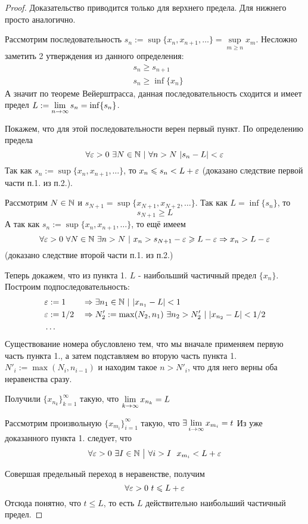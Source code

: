\begin{proof}
	Доказательство приводится только для верхнего предела. Для нижнего просто аналогично.
	
	Рассмотрим последовательность $s_n := \sup \{x_n, x_{n + 1}, \dots\} = \sup\limits_{m \ge n} x_m$. Несложно заметить 2 утверждения из данного определения:
	\begin{align*}
		&s_n \ge s_{n + 1}
		\\
		&s_n \ge \inf \{x_n\}
	\end{align*}
	А значит по теореме Вейерштрасса, данная последовательность сходится и имеет предел $L := \lim\limits_{n \to \infty} s_n = \inf \{s_n\}$. 
	
	Покажем, что для этой последовательности верен первый пункт. По определению предела 
	$$
		\forall \eps > 0\ \exists N \in \N\ |\ \forall n > N\ |s_n - L| < \eps
	$$
	Так как $s_n := \sup \{x_n, x_{n + 1}, \dots\}$, то $x_n \leqslant s_n < L + \varepsilon$ (доказано следствие первой части п.1. из п.2.).
	
	Рассмотрим $N \in \mathbb{N}$ и $s_{N + 1} = \sup \{x_{N + 1}, x_{N + 2}, \dots\}$. Так как $L = \inf \{s_n\}$, то 
	$$
		s_{N + 1} \ge L
	$$
	А так как $s_n := \sup \{x_n, x_{n + 1}, \dots\}$, то ещё имеем
	$$
		\forall \varepsilon > 0\ \forall N \in \mathbb{N}\ \exists n > N\ |\ x_n > s_{N + 1} - \varepsilon \geqslant L - \varepsilon \Rightarrow x_n > L - \varepsilon
	$$
	(доказано следствие второй части п.1. из п.2.)
	
	Теперь докажем, что из пункта 1. $L$ - наибольший частичный предел $\{x_n\}$. Построим подпоследовательность:
	\begin{align*}
		&\varepsilon := 1 & &\Rightarrow \exists n_1 \in \mathbb{N}\ |\ |x_{n_1} - L| < 1
		\\
		&\varepsilon := 1/2 & &\Rightarrow N'_2 := \max(N_2, n_1)\ \exists n_2 > N'_2\ |\ |x_{n_2} - L| < 1/2
		\\
		&\dots		
	\end{align*}
	Существование номера обусловлено тем, что мы вначале применяем первую часть пункта 1., а затем подставляем во вторую часть пункта 1. $N'_i := \max(N_i, n_{i - 1})$ и находим такое $n > N'_i$, что для него верны оба неравенства сразу.
	
	Получили $\{x_{n_k}\}_{k = 1}^\infty$ такую, что $\lim\limits_{k \to \infty} x_{n_k} = L$
	
	Рассмотрим произвольную $\{x_{m_i}\}_{i = 1}^\infty$ такую, что $\exists \lim\limits_{i \to \infty} x_{m_i} = t$ Из уже доказанного пункта 1. следует, что
	$$
		\forall \varepsilon > 0\ \exists I \in \mathbb{N} \ \big|\  \forall i > I\ \ x_{m_i} < L + \varepsilon
	$$
	
	Совершая предельный переход в неравенстве, получим
	$$
		\forall \varepsilon > 0\ t \leqslant L + \varepsilon
	$$
	Отсюда понятно, что $t \le L$, то есть $L$ действительно наибольший частичный предел.
\end{proof}

